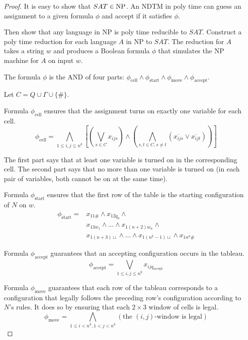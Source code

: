 \begin{mdframed}
\begin{proof}
It is easy to show that $SAT \in \text{NP}$. An NDTM in poly time can guess an assignment to a given formula $\phi$ and accept if it satisfies $\phi$.

\medskip
Then show that any language in NP is poly time reducible to $SAT$. Construct a poly time reduction for each language $A$ in NP to $SAT$. The reduction for $A$ takes a string $w$ and produces a Boolean formula $\phi$ that simulates the NP machine for $A$ on input $w$.

\medskip
The formula $\phi$ is the AND of four parts: $\phi_\text{cell} \land \phi_\text{start} \land \phi_\text{move} \land \phi_\text{accept}$.

Let $C = Q \cup \Gamma \cup \{ \#\}$.

Formula $\phi_\text{cell}$ ensures that the assignment turns on exactly one variable for each cell.
\[
\phi_\text{cell} = \bigwedge_{1 \leq i, j \leq n^k} 
\left[\left( \bigvee_{s\in C} x_{ijs}\right)
\land \left( \bigwedge_{s,t\in C, s\neq t} 
(\overline{x_{ijs}} \lor \overline{x_{ijt}})\right) \right]
\]

The first part says that at least one variable is turned on in the corresponding cell. The second part says that no more than one variable is turned on (in each pair of variables, both cannot be on at the same time).

Formula $\phi_\text{start}$ ensures that the first row of the table is the starting configuration of $N$ on $w$.
\begin{align*}
\phi_\text{start} = &x_{11\#} \land x_{12q_0} \land \\
& x_{13w_1} \land \ldots \land x_{1(n+2)w_n}  \land \\
& x_{1(n+3)\sqcup} \land \ldots \land x_{1(n^k-1)\sqcup} \land x_{1n^k\#}
\end{align*}

Formula $\phi_\text{accept}$ guarantees that an accepting configuration occurs in the tableau.
\[
\phi_\text{accept} = \bigvee_{1\leq i, j \leq n^k} x_{ijq_\text{accept}}
\]

Formula $\phi_\text{move}$ guarantees that each row of the tableau corresponds to a configuration that legally follows the preceding row's configuration according to $N$'s rules. It does so by ensuring that each $2\times 3$ window of cells is legal.
\[
\phi_\text{move} = \bigwedge_{1 \leq i < n^k, 1 < j < n^k} 
(\text{the $(i, j)$-window is legal})
\]


\end{proof}
\end{mdframed}
